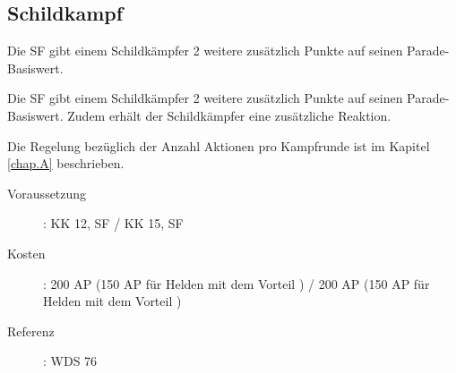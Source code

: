 \subsection{Schildkampf}
\label{sf.schildkampf}
Die SF  gibt einem Schildkämpfer 2 weitere zusätzlich Punkte auf seinen Parade-Basiswert.

Die SF  gibt einem Schildkämpfer 2 weitere zusätzlich Punkte auf seinen Parade-Basiswert.
Zudem erhält der Schildkämpfer eine zusätzliche Reaktion.

Die Regelung bezüglich der Anzahl Aktionen pro Kampfrunde ist im Kapitel \ref{chap.A} beschrieben.
\begin{description}
    \item[Voraussetzung]:
        KK 12, SF  / KK 15, SF 
    \item [Kosten]:
        200 AP (150 AP für Helden mit dem Vorteil ) / 200 AP (150 AP für Helden mit dem Vorteil )
    \item [Referenz]:
        WDS 76
\end{description}
